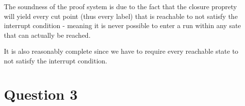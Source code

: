 \documentclass{article}
\begin{document}
The soundness of the proof system is due to the fact that the closure proprety
will yield every cut point (thus every label) that is reachable to not satisfy the
interrupt condition - meaning it is never possible to enter a run within any sate that can actually be reached.

It is also reasonably complete since we have to require
every reachable state to not satisfy the interrupt condition.


\section*{Question 3}
\end{document}
